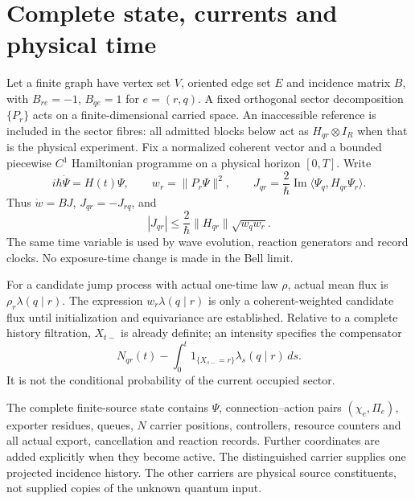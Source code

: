 \documentclass[11pt,oneside,openany]{book}
\theoremstyle{definition}
\theoremstyle{remark}\newtheorem{remark}[theorem]{Remark}
\begin{document}
\section{Complete state, currents and physical time}
Let a finite graph have vertex set $V$, oriented edge set $E$ and incidence
matrix $B$, with $B_{re}=-1$, $B_{qe}=1$ for $e=(r,q)$. A fixed orthogonal
sector decomposition $\{P_r\}$ acts on a finite-dimensional carried space.
An inaccessible reference is included in the sector fibres: all admitted
blocks below act as $H_{qr}\otimes I_R$ when that is the physical experiment.
Fix a normalized coherent vector and a bounded piecewise $C^1$ Hamiltonian
programme on a physical horizon $[0,T]$. Write
\begin{equation}
 i\hbar\dot\Psi=H(t)\Psi,\qquad
 w_r=\|P_r\Psi\|^2,\qquad
 J_{qr}=\frac2\hbar\operatorname{Im}\langle\Psi_q,H_{qr}\Psi_r\rangle.
 \label{kin:current}
\end{equation}
Thus $\dot w=BJ$, $J_{qr}=-J_{rq}$, and
\begin{equation}
 |J_{qr}|\le\frac2\hbar\|H_{qr}\|\sqrt{w_qw_r}.
 \label{kin:nodal}
\end{equation}
The same time variable is used by wave evolution, reaction generators and
record clocks. No exposure-time change is made in the Bell limit.

For a candidate jump process with actual one-time law $\rho$, actual mean
flux is $\rho_r\lambda(q\mid r)$. The expression $w_r\lambda(q\mid r)$ is
only a coherent-weighted candidate flux until initialization and equivariance
are established. Relative to a complete history filtration, $X_{t-}$ is
already definite; an intensity specifies the compensator
\[
 N_{qr}(t)-\int_0^t1_{\{X_{s-}=r\}}\lambda_s(q\mid r)\,ds.
\]
It is not the conditional probability of the current occupied sector.

The complete finite-source state contains $\Psi$, connection--action pairs
$(\chi_e,\Pi_e)$, exporter residues, queues, $N$ carrier positions,
controllers, resource counters and all actual export, cancellation and
reaction records. Further coordinates are added explicitly when they become
active. The distinguished carrier supplies one projected incidence history.
The other carriers are physical source constituents, not supplied copies of
the unknown quantum input.
\end{document}
